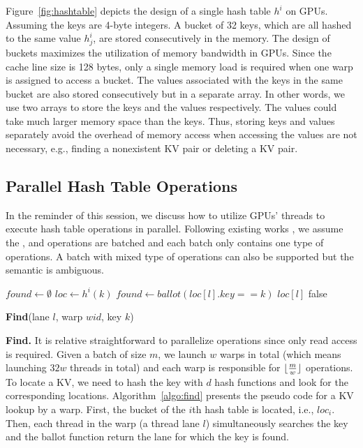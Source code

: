 Figure~\ref{fig:hashtable} depicts the design of a single hash table $h^i$ on GPUs. 
Assuming the keys are 4-byte integers. A bucket of 32 keys, which are all hashed to the same value $h^i_j$, are stored consecutively in the memory. 
The design of buckets maximizes the utilization of memory bandwidth in GPUs. 
Since the cache line size is 128 bytes, only a single memory load is required when one warp is assigned to access a bucket. 
The values associated with the keys in the same bucket are also stored consecutively but in a separate array.   
In other words, we use two arrays to store the keys and the values respectively.
The values could take much larger memory space than the keys. 
Thus, storing keys and values separately avoid the overhead of memory access when accessing the values are not necessary, 
e.g., finding a nonexistent KV pair or deleting a KV pair. 



\subsection{Parallel Hash Table Operations}\label{sec:vot:con}
In the reminder of this session, we discuss how to utilize GPUs' threads to execute hash table operations in parallel.
Following existing works \cite{alcantara2009real,zhang2015mega,breslow2016horton}, we assume the ,  and  operations are batched and each batch only contains one type of operations. A batch with mixed type of operations can also be supported but the semantic is ambiguous. 

\begin{algorithm}[t]
	\begin{algorithmic}[1]
		\State $found \gets \emptyset$
		\State $loc \gets h^i(k)$
		\State $found \gets ballot(loc[l].key == k)$
		\State \Return $loc[l]$
		\EndIf
		\EndFor
		\State \Return false
	\end{algorithmic}
	\caption{\textbf{Find}(lane $l$, warp $wid$, key $k$)}\label{algo:find}
\end{algorithm}

\vspace{1mm}\noindent\textbf{Find.} It is relative straightforward to parallelize  operations since only read access is required. 
Given a batch of size $m$, we launch $w$ warps in total (which means launching $32w$ threads in total) and each warp is responsible for $\lfloor\frac{m}{w}\rfloor$  operations. To locate a KV, we need to hash the key with $d$ hash functions and look for the corresponding locations. 
Algorithm~\ref{algo:find} presents the pseudo code for a KV lookup by a warp. 
First, the bucket of the $i$th hash table is located, i.e., $loc_i$.
Then, each thread in the warp (a thread lane $l$) simultaneously searches the key and the ballot function return the lane for which the key is found.

